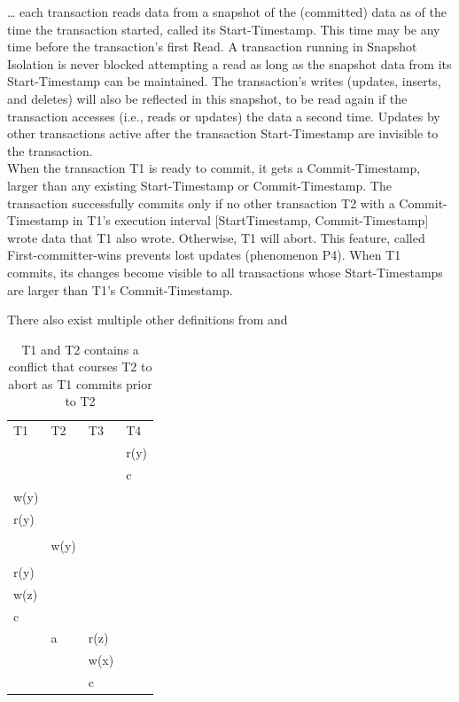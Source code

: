 \documentclass[a4paper,10pt,titlepage]{report}
\begin{document}
    \begin{displayquote}
    … each transaction reads data from a snapshot of the (committed) data as of the time the transaction started, called its Start-Timestamp. This time may be any time before the transaction's first Read. A transaction running in Snapshot Isolation is never blocked attempting a read as long as the snapshot data from its Start-Timestamp can be maintained. The transaction's writes (updates, inserts, and deletes) will also be reflected in this snapshot, to be read again if the transaction accesses (i.e., reads or updates) the data a second time. Updates by other transactions active after the transaction Start-Timestamp are invisible to the transaction.
    \\
    When the transaction T1 is ready to commit, it gets a Commit-Timestamp, larger than any existing Start-Timestamp or Commit-Timestamp. The transaction successfully commits only if no other transaction T2 with a Commit-Timestamp in T1's execution interval [StartTimestamp, Commit-Timestamp] wrote data that T1 also wrote. Otherwise, T1 will abort. This feature, called First-committer-wins prevents lost updates (phenomenon P4). When T1 commits, its changes become visible to all transactions whose Start-Timestamps are larger than T1's Commit-Timestamp.
    \end{displayquote}
   

    There also exist multiple other definitions from \cite{CeroneBernardiGotsman} and \cite{CrooksPuAlvisiClement}


    \begin{table}[h]
        \begin{tabular}{l|l|l|l}
            T1   & T2   & T3   & T4   \\
            &      &      & r(y) \\
            &      &      & c    \\
            w(y) &      &      &      \\
            r(y) &      &      &      \\
            &      &      &      \\
            & w(y) &      &      \\
            &      &      &      \\
            r(y) &      &      &      \\
            w(z) &      &      &      \\
            c    &      &      &      \\
            & a    & r(z) &      \\
            &      & w(x) &      \\
            &      & c    &
        \end{tabular}
        \caption{T1 and T2 contains a conflict that courses T2 to abort as T1 commits prior to T2}
    \end{table}
\end{document}
